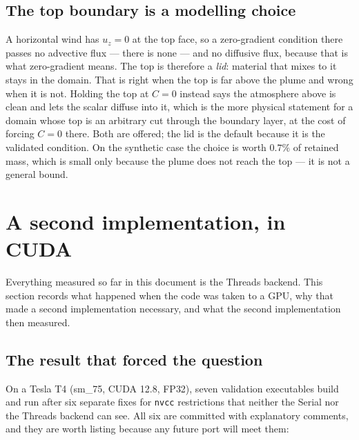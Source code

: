 \documentclass[11pt,a4paper]{article}
\newcommand{\code}[1]{\texttt{\small #1}}
\begin{document}
\subsection{The top boundary is a modelling choice}

A horizontal wind has $u_z = 0$ at the top face, so a zero-gradient condition
there passes no advective flux --- there is none --- and no diffusive flux,
because that is what zero-gradient means. The top is therefore a \emph{lid}:
material that mixes to it stays in the domain. That is right when the top is far
above the plume and wrong when it is not. Holding the top at $C=0$ instead says
the atmosphere above is clean and lets the scalar diffuse into it, which is the
more physical statement for a domain whose top is an arbitrary cut through the
boundary layer, at the cost of forcing $C=0$ there. Both are offered; the lid is
the default because it is the validated condition. On the synthetic case the
choice is worth $0.7\%$ of retained mass, which is small only because the plume
does not reach the top --- it is not a general bound.


\section{A second implementation, in CUDA}
\label{sec:cuda}

Everything measured so far in this document is the Threads backend. This section
records what happened when the code was taken to a GPU, why that made a second
implementation necessary, and what the second implementation then measured.

\subsection{The result that forced the question}
\label{sec:cmcollapse}

On a Tesla T4 (sm\_75, CUDA 12.8, FP32), seven validation executables build and
run after six separate fixes for \code{nvcc} restrictions that neither the Serial
nor the Threads backend can see. All six are committed with explanatory comments,
and they are worth listing because any future port will meet them:
\end{document}
